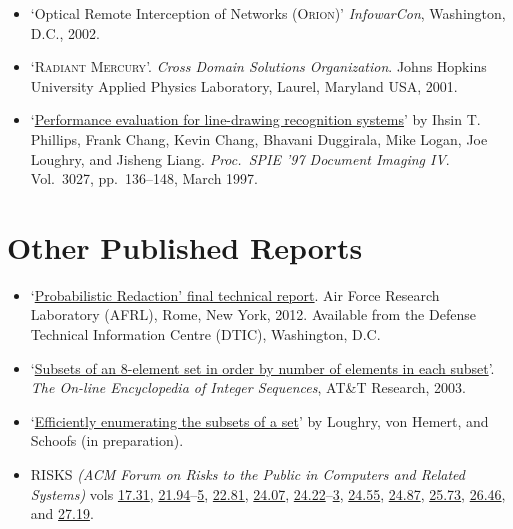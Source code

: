\documentclass[12pt,letterpaper]{article}
\begin{document}
\begin{itemize}
    \item `Optical Remote Interception of Networks (\textsc{Orion})'
		\emph{InfowarCon}, Washington, D.C., 2002.

    \item `\textsc{Radiant Mercury}'. \emph{Cross Domain Solutions
		Organization}. Johns Hopkins University Applied Physics Laboratory,
		Laurel, Maryland USA, 2001.

    \item `\href{http://proceedings.spiedigitallibrary.org/proceeding.aspx?articleid=920871}{Performance
		evaluation for line-drawing recognition systems}'
		by Ihsin T. Phillips, Frank Chang, Kevin Chang, Bhavani Duggirala,
		Mike Logan, Joe Loughry, and Jisheng Liang. \emph{Proc.\ SPIE '97
		Document Imaging IV}. Vol.\ 3027, pp.\ 136--148, March 1997.
\end{itemize}

\vspace{-8mm}
\section*{Other Published Reports}

\begin{itemize}
	\item `\href{http://applied-math.org/Loughry2011.pdf}{Probabilistic Redaction' final
		technical report}. Air Force Research Laboratory (AFRL), Rome, New York, 2012.
		Available from the Defense Technical Information Centre (DTIC), Washington, D.C.

	\item `\href{http://oeis.org/A047869}{Subsets of an 8-element set in order by number
		of elements in each subset}'. \emph{The On-line Encyclopedia of Integer Sequences},
		AT\&T Research, 2003.

	\item `\href{http://www.applied-math.org/subset.pdf}{Efficiently enumerating the
		subsets of a set}' by Loughry, von Hemert, and Schoofs (in preparation).

    \item RISKS \emph{(ACM Forum on Risks to the Public in Computers
    and Related Systems)} vols \href{http://catless.ncl.ac.uk/Risks/17.31.html}{17.31},
	\href{http://catless.ncl.ac.uk/Risks/21.94.html}{21.94}--\href{http://catless.ncl.ac.uk/Risks/21.95.html}{5},
	\href{http://catless.ncl.ac.uk/Risks/21.81.html}{22.81},
	\href{http://catless.ncl.ac.uk/Risks/24.07.html}{24.07},
    \href{http://catless.ncl.ac.uk/Risks/24.22.html}{24.22}--\href{http://catless.ncl.ac.uk/Risks/24.23.html}{3},
	\href{http://catless.ncl.ac.uk/Risks/24.55.html}{24.55},
	\href{http://catless.ncl.ac.uk/Risks/24.87.html}{24.87},
	\href{http://catless.ncl.ac.uk/Risks/25.73.html}{25.73},
	\href{http://catless.ncl.ac.uk/Risks/26.46.html}{26.46},
	and \href{http://catless.ncl.ac.uk/Risks/27.19.html}{27.19}.
\end{itemize}
\end{document}
